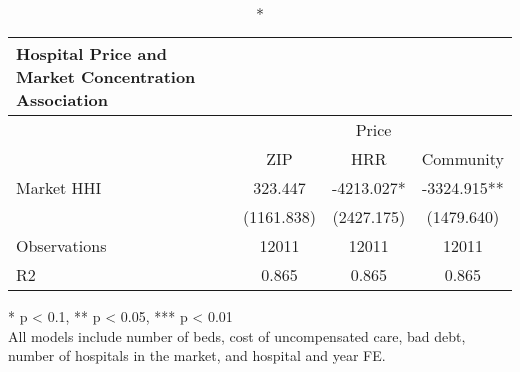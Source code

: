 \setlength{\LTpost}{0mm}
\begin{longtable}{lccc}
\caption*{
{\large Hospital Price and Market Concentration Association}
} \\ 
\toprule
 & \multicolumn{3}{c}{Price} \\ 
\cmidrule(lr){2-4}
  & ZIP & HRR & Community \\ 
\midrule\addlinespace[2.5pt]
Market HHI & 323.447 & -4213.027* & -3324.915** \\ 
 & (1161.838) & (2427.175) & (1479.640) \\ 
Observations & 12011 & 12011 & 12011 \\ 
R2 & 0.865 & 0.865 & 0.865 \\ 
\bottomrule
\end{longtable}
\begin{minipage}{\linewidth}
* p < 0.1, ** p < 0.05, *** p < 0.01\\
All models include number of beds, cost of uncompensated care, bad debt, number of hospitals in the market, and hospital and year FE.\\
\end{minipage}

